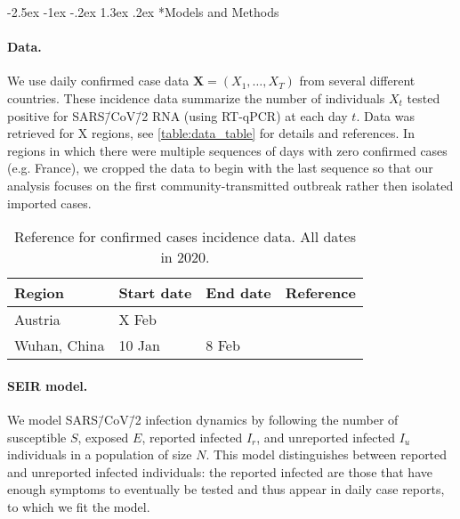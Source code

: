 \documentclass[12pt]{extarticle}
\makeatletter
\renewcommand\section{\@startsection {section}{1}{\z@}%
     {-2.5ex \@plus -1ex \@minus -.2ex}%
     {1.3ex \@plus.2ex}%
    {\Large\bfseries}}
\let\vec\mathbf
\makeatother
\begin{document}
\section*{Models and Methods}

\paragraph*{Data.} 
We use daily confirmed case data $\vec{X}=(X_1, \ldots, X_T)$ from several different countries. These incidence data summarize the number of individuals $X_t$ tested positive for SARS\=/CoV\=/2 RNA (using RT-qPCR) at each day $t$.
Data was retrieved for X regions, see \autoref{table:data_table} for details and references.
In regions in which there were multiple sequences of days with zero confirmed cases (e.g. France), we cropped the data to begin with the last sequence so that our analysis focuses on the first community-transmitted outbreak rather then isolated imported cases. 

\begin{table}[h]
\centering
\begin{tabular}{@{}llll@{}}
\toprule
Region       & Start date & End date & Reference           \\ \midrule
Austria      & X Feb      &          & \citet{Flaxman2020} \\
Wuhan, China & 10 Jan     & 8 Feb    & \citet{Pei2020}     \\ \bottomrule
\end{tabular}
\caption{Reference for confirmed cases incidence data. All dates in 2020.}
\label{table:data_table}
\end{table}



\paragraph*{SEIR model.}
We model SARS\=/CoV\=/2 infection dynamics by following the number of susceptible $S$, exposed $E$, reported infected $I_r$, and unreported infected $I_u$ individuals in a population of size $N$.
This model distinguishes between reported and unreported infected individuals: the reported infected are those that have enough symptoms to eventually be tested and thus appear in daily case reports, to which we fit the model.
\end{document}
